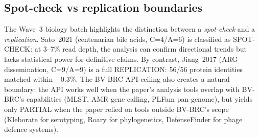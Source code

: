\subsection{Spot-check vs replication boundaries}
The Wave~3 biology batch highlights the distinction between a \emph{spot-check}
and a \emph{replication}. Sato~2021 (centenarian bile acids, C=4/A=6) is
classified as SPOT-CHECK: at 3--7\% read depth, the analysis can confirm
directional trends but lacks statistical power for definitive claims. By
contrast, Jiang~2017 (ARG dissemination, C=9/A=9) is a full REPLICATION:
56/56 protein identities matched within $\pm$0.3\%. The BV-BRC API ceiling
also creates a natural boundary: the API works well when the paper's analysis
tools overlap with BV-BRC's capabilities (MLST, AMR gene calling, PLFam
pan-genome), but yields only PARTIAL when the paper relied on tools outside
BV-BRC's scope (Kleborate for serotyping, Roary for phylogenetics, DefenseFinder
for phage defence systems).
